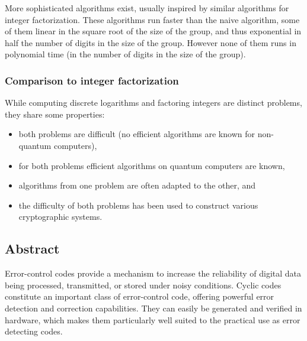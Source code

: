 \documentclass[a4paper, 11pt]{article}
\begin{document}
More sophisticated algorithms exist, usually inspired by similar algorithms for integer factorization. These algorithms run faster than the naive algorithm, some of them linear in the square root of the size of the group, and thus exponential in half the number of digits in the size of the group. However none of them runs in polynomial time (in the number of digits in the size of the group).


\subsubsection{Comparison to integer factorization}
While computing discrete logarithms and factoring integers are distinct problems, they share some properties:

\begin{itemize}
	\setlength{\itemsep}{-2pt}
	\item both problems are difficult (no efficient algorithms are known for non-quantum computers),
	\item for both problems efficient algorithms on quantum computers are known,
	\item algorithms from one problem are often adapted to the other, and
	\item the difficulty of both problems has been used to construct various cryptographic systems.
\end{itemize}

\subsection{Abstract}
Error-control codes provide a mechanism to increase the reliability of digital data being processed, transmitted, or stored under noisy conditions. Cyclic codes constitute an important class of error-control code, offering powerful error detection and correction capabilities. They can easily be generated and verified in hardware, which makes them particularly well suited to the practical use as error detecting codes.
\end{document}
